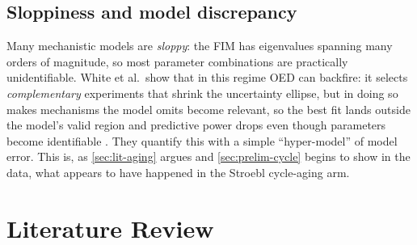 \documentclass[11pt,letterpaper]{article}
\begin{document}
\subsection{Sloppiness and model discrepancy}\label{sec:sloppy}
Many mechanistic models are \emph{sloppy}: the FIM has eigenvalues spanning many orders of magnitude, so most parameter combinations are practically unidentifiable. White et al.\ show that in this regime OED can backfire: it selects \emph{complementary} experiments that shrink the uncertainty ellipse, but in doing so makes mechanisms the model omits become relevant, so the best fit lands outside the model's valid region and predictive power drops even though parameters become identifiable \cite{white2016}. They quantify this with a simple ``hyper-model'' of model error. This is, as \cref{sec:lit-aging} argues and \cref{sec:prelim-cycle} begins to show in the data, what appears to have happened in the Stroebl cycle-aging arm.

\section{Literature Review}\label{sec:lit}
\end{document}
